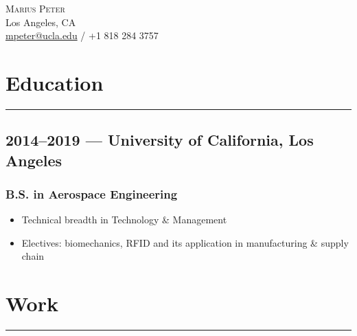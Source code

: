 \documentclass[10pt]{article}
\begin{document}
\renewcommand\labelitemi{-}
\begin{center}
    \huge \textsc{Marius Peter}\\[0.2cm]

    \normalsize
    Los Angeles, CA\\
    \href{mailto:mpeter@ucla.edu}{mpeter@ucla.edu} / +1 818 284 3757\\
\end{center}


\section*{Education}
\rule{\linewidth}{1pt}
\subsection*{2014--2019 --- University of California, Los Angeles}
\subsubsection*{B.S. in Aerospace Engineering}
\begin{itemize}
    \item Technical breadth in Technology \& Management
    \item Electives: biomechanics, RFID and its application in manufacturing \& supply chain
\end{itemize}

\section*{Work}
\rule{\linewidth}{1pt}\\
\end{document}
